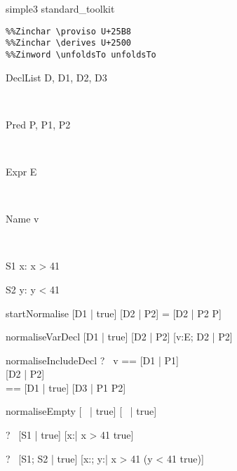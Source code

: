 \begin{zsection}
\SECTION simple3 \parents standard\_toolkit
\end{zsection}

\begin{verbatim}
%%Zinchar \proviso U+25B8
%%Zinchar \derives U+2500
%%Zinword \unfoldsTo unfoldsTo
\end{verbatim}
\newcommand{\unfoldsTo}{\mathrel{\leadsto}}

\begin{zedjoker}{DeclList} D, D1, D2, D3\end{zedjoker} \\
\begin{zedjoker}{Pred} P, P1, P2\end{zedjoker} \\
\begin{zedjoker}{Expr} E\end{zedjoker} \\
\begin{zedjoker}{Name} v\end{zedjoker} \\

\begin{schema}{S1}
  x:\nat
\where
  x > 41
\end{schema}

\begin{schema}{S2}
  y:\nat
\where
  y < 41
\end{schema}

\begin{zedrule}{startNormalise}
   [D1 | true] \unfoldsTo [D2 | P2]
\derives
   [D1 | P] = [D2 | P2 \land P]
\end{zedrule}

\begin{zedrule}{normaliseVarDecl}
   [D1 | true] \unfoldsTo [D2 | P2]
\derives
   [v:E; D1 | true] \unfoldsTo [v:E; D2 | P2]
\end{zedrule}

\begin{zedrule}{normaliseIncludeDecl}
   \proviso ?~ v == [D1 | P1] \\
   [D | true] \unfoldsTo [D2 | P2] \\
   \proviso [D3 | true] == [D1 | true] \schemamerge [D2 | true]
\derives
   [v; D | true] \unfoldsTo [D3 | P1 \land P2]
\end{zedrule}

\begin{zedrule}{normaliseEmpty}
   [~ | true] \unfoldsTo [~ | true]
\end{zedrule}

\begin{zed}
  \vdash?~ [S1 | true] \unfoldsTo [x:\nat | x > 41 \land true]
\end{zed}

\begin{zed}
  \vdash?~ [S1; S2 | true] \unfoldsTo
           [x:\nat; y:\nat | x > 41 \land (y < 41 \land true)]
\end{zed}
